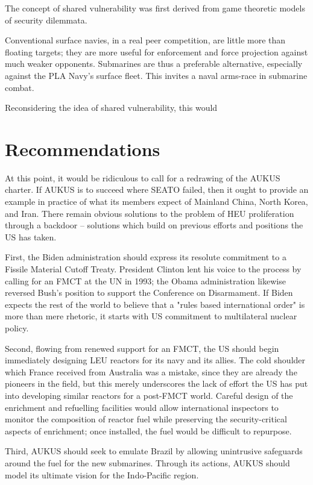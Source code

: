 \documentclass[letterpaper,12pt,twoside]{article} %
\begin{document}
\begin{multicols}{2}
The concept of shared vulnerability was first derived from game theoretic models of security dilemmata.

Conventional surface navies, in a real peer competition, are little more than floating targets; they are more useful for enforcement and force projection against much weaker opponents. Submarines are thus a preferable alternative, especially against the PLA Navy's surface fleet. This invites a naval arms-race in submarine combat.

Reconsidering the idea of shared vulnerability, this would

\vfill
\pagebreak
\section{Recommendations}

At this point, it would be ridiculous to call for a redrawing of the AUKUS charter. If AUKUS is to succeed where SEATO failed, then it ought to provide an example in practice of what its members expect of Mainland China, North Korea, and Iran. There remain obvious solutions to the problem of HEU proliferation through a backdoor -- solutions which build on previous efforts and positions the US has taken.

First, the Biden administration should express its resolute commitment to a Fissile Material Cutoff Treaty. President Clinton lent his voice to the process by calling for an FMCT at the UN in 1993; the Obama administration likewise reversed Bush's position to support the Conference on Disarmament. If Biden expects the rest of the world to believe that a "rules based international order" is more than mere rhetoric, it starts with US commitment to multilateral nuclear policy.

Second, flowing from renewed support for an FMCT, the US should begin immediately designing LEU reactors for its navy and its allies. The cold shoulder which France received from Australia was a mistake, since they are already the pioneers in the field, but this merely underscores the lack of effort the US has put into developing similar reactors for a post-FMCT world. Careful design of the enrichment and refuelling facilities would allow international inspectors to monitor the composition of reactor fuel while preserving the security-critical aspects of enrichment; once installed, the fuel would be difficult to repurpose.

Third, AUKUS should seek to emulate Brazil by allowing unintrusive safeguards around the fuel for the new submarines. Through its actions, AUKUS should model its ultimate vision for the Indo-Pacific region.

\end{multicols}
  \vfill
  \pagebreak

\nocite{philippe2014safeguarding}
\nocite{costa2017brazil}

\printbibliography[heading=bibintoc,title=Bibliography]


\end{document}
